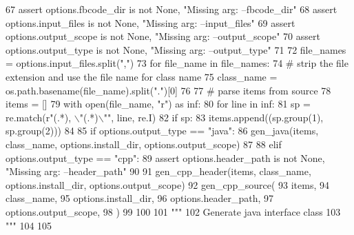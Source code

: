 \begin{DoxyCode}
67     \textcolor{keyword}{assert} options.fbcode\_dir \textcolor{keywordflow}{is} \textcolor{keywordflow}{not} \textcolor{keywordtype}{None}, \textcolor{stringliteral}{"Missing arg: --fbcode\_dir"}
68     \textcolor{keyword}{assert} options.input\_files \textcolor{keywordflow}{is} \textcolor{keywordflow}{not} \textcolor{keywordtype}{None}, \textcolor{stringliteral}{"Missing arg: --input\_files"}
69     \textcolor{keyword}{assert} options.output\_scope \textcolor{keywordflow}{is} \textcolor{keywordflow}{not} \textcolor{keywordtype}{None}, \textcolor{stringliteral}{"Missing arg: --output\_scope"}
70     \textcolor{keyword}{assert} options.output\_type \textcolor{keywordflow}{is} \textcolor{keywordflow}{not} \textcolor{keywordtype}{None}, \textcolor{stringliteral}{"Missing arg: --output\_type"}
71 
72     file\_names = options.input\_files.split(\textcolor{stringliteral}{","})
73     \textcolor{keywordflow}{for} file\_name \textcolor{keywordflow}{in} file\_names:
74         \textcolor{comment}{# strip the file extension and use the file name for class name}
75         class\_name = os.path.basename(file\_name).split(\textcolor{stringliteral}{"."})[0]
76 
77         \textcolor{comment}{# parse items from source}
78         items = []
79         with open(file\_name, \textcolor{stringliteral}{"r") as inf:}
80 \textcolor{stringliteral}{            }\textcolor{keywordflow}{for} line \textcolor{keywordflow}{in} inf:
81                 sp = re.match(\textcolor{stringliteral}{r"(.*), \(\backslash\)"(.*)\(\backslash\)""}, line, re.I)
82                 \textcolor{keywordflow}{if} sp:
83                     items.append((sp.group(1), sp.group(2)))
84 
85         \textcolor{keywordflow}{if} options.output\_type == \textcolor{stringliteral}{"java"}:
86             gen_java(items, class\_name, options.install\_dir, options.output\_scope)
87 
88         \textcolor{keywordflow}{elif} options.output\_type == \textcolor{stringliteral}{"cpp"}:
89             \textcolor{keyword}{assert} options.header\_path \textcolor{keywordflow}{is} \textcolor{keywordflow}{not} \textcolor{keywordtype}{None}, \textcolor{stringliteral}{"Missing arg: --header\_path"}
90 
91             gen_cpp_header(items, class\_name, options.install\_dir, options.output\_scope)
92             gen_cpp_source(
93                 items,
94                 class\_name,
95                 options.install\_dir,
96                 options.header\_path,
97                 options.output\_scope,
98             )
99 
100 
101 \textcolor{stringliteral}{"""}
102 \textcolor{stringliteral}{Generate java interface class}
103 \textcolor{stringliteral}{"""}
104 
105 
\end{DoxyCode}
